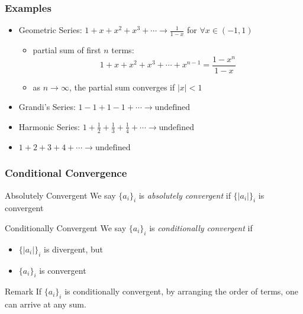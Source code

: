 \documentclass{beamer}
\begin{document}
\begin{frame}
\frametitle{Examples}

\begin{itemize}
    \item Geometric Series: $ 1 + x + x^2 + x^3 + \cdots \longrightarrow \frac{1}{1-x} $ for $ \forall x \in (-1,1) $
    \begin{itemize}
        \item partial sum of first $n$ terms: 
        $$ 1 + x + x^2 + x^3 + \cdots + x^{n-1} = \frac{1 - x^n}{1-x} $$
        \item as $ n \rightarrow \infty $, the partial sum converges if $ |x| < 1 $
    \end{itemize}
    \item Grandi's Series: $ 1 - 1 + 1 - 1 + \cdots \longrightarrow \text{undefined} $
    \item Harmonic Series: $ 1 + \frac{1}{2} + \frac{1}{3} + \frac{1}{4} + \cdots \longrightarrow \text{undefined} $
    \item $ 1 + 2 + 3 + 4 + \cdots \longrightarrow \text{undefined} $
\end{itemize}

\end{frame}


\begin{frame}
\frametitle{Conditional Convergence}

\begin{block}{Absolutely Convergent}
We say $ \{a_i\}_i $ is \emph{absolutely convergent} if $ \{ |a_i| \}_i $ is convergent 
\end{block}

\begin{block}{Conditionally Convergent}
We say $ \{a_i\}_i $ is \emph{conditionally convergent} if 
\begin{itemize}
    \item $ \{ |a_i| \}_i $ is divergent, but 
    \item $ \{a_i\}_i $ is convergent
\end{itemize}
\end{block}

\begin{block}{Remark}
If $ \{a_i\}_i $ is conditionally convergent, by arranging the order of terms, one can arrive at any sum. 
\end{block}

\end{frame}
\end{document}

